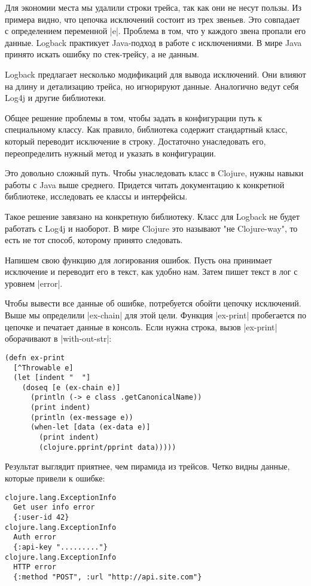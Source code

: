 Для экономии места мы удалили строки трейса, так как они не несут пользы. Из
примера видно, что цепочка исключений состоит из трех звеньев. Это совпадает с
определением переменной \spverb|e|. Проблема в том, что у каждого звена пропали его
данные. Logback практикует Java-подход в работе с исключениями. В мире Java
принято искать ошибку по стек-трейсу, а не данным.

Logback предлагает несколько модификаций для вывода исключений. Они влияют на
длину и детализацию трейса, но игнорируют данные. Аналогично ведут себя Log4j и
другие библиотеки.

Общее решение проблемы в том, чтобы задать в конфигурации путь к специальному
классу. Как правило, библиотека содержит стандартный класс, который переводит
исключение в строку. Достаточно унаследовать его, переопределить нужный метод и
указать в конфигурации.

Это довольно сложный путь. Чтобы унаследовать класс в Clojure, нужны навыки
работы с Java выше среднего. Придется читать документацию к конкретной
библиотеке, исследовать ее классы и интерфейсы.

Такое решение завязано на конкретную библиотеку. Класс для Logback не будет
работать с Log4j и наоборот. В мире Clojure это называют "не Clojure-way", то
есть не тот способ, которому принято следовать.

Напишем свою функцию для логирования ошибок. Пусть она принимает исключение и
переводит его в текст, как удобно нам. Затем пишет текст в лог с уровнем
\spverb|error|.

Чтобы вывести все данные об ошибке, потребуется обойти цепочку исключений. Выше
мы определили \spverb|ex-chain| для этой цели. Функция \spverb|ex-print| пробегается по
цепочке и печатает данные в консоль. Если нужна строка, вызов \spverb|ex-print|
оборачивают в \spverb|with-out-str|:

\begin{verbatim}
(defn ex-print
  [^Throwable e]
  (let [indent "  "]
    (doseq [e (ex-chain e)]
      (println (-> e class .getCanonicalName))
      (print indent)
      (println (ex-message e))
      (when-let [data (ex-data e)]
        (print indent)
        (clojure.pprint/pprint data)))))
\end{verbatim}

Результат выглядит приятнее, чем пирамида из трейсов. Четко видны данные,
которые привели к ошибке:

\begin{verbatim}
clojure.lang.ExceptionInfo
  Get user info error
  {:user-id 42}
clojure.lang.ExceptionInfo
  Auth error
  {:api-key "........."}
clojure.lang.ExceptionInfo
  HTTP error
  {:method "POST", :url "http://api.site.com"}
\end{verbatim}

